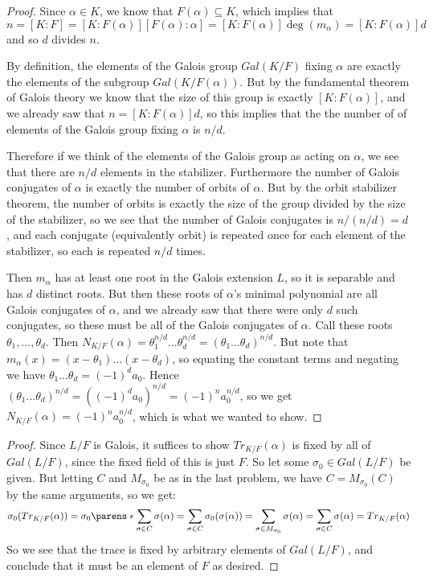 \documentclass[11pt]{article}
\begin{document}
\begin{proof}
  Since $\alpha \in K$, we know that $F(\alpha) \subseteq K$, which implies that
  \begin{equation*}
    n = [K:F] = [K:F(\alpha)][F(\alpha):\alpha] = [K:F(\alpha)]\deg(m_{\alpha}) = [K:F(\alpha)]d
  \end{equation*}
  and so $d$ divides $n$.

  By definition, the elements of the Galois group $Gal(K/F)$ fixing $\alpha$ are exactly the elements of the subgroup $Gal(K/F(\alpha))$.
  But by the fundamental theorem of Galois theory we know that the size of this group is exactly $[K:F(\alpha)]$, and we already saw that $n = [K:F(\alpha)]d$, so this implies that the the number of of elements of the Galois group fixing $\alpha$ is $n/d$.
  
  Therefore if we think of the elements of the Galois group as acting on $\alpha$, we see that there are $n/d$ elements in the stabilizer.
  Furthermore the number of Galois conjugates of $\alpha$ is exactly the number of orbits of $\alpha$.
  But by the orbit stabilizer theorem, the number of orbits is exactly the size of the group divided by the size of the stabilizer, so we see that the number of Galois conjugates is $n / (n/d) = d$, and each conjugate (equivalently orbit) is repeated once for each element of the stabilizer, so each is repeated $n/d$ times.

  Then $m_\alpha$ has at least one root in the Galois extension $L$, so it is separable and has $d$ distinct roots.
  But then these roots of $\alpha$'s minimal polynomial are all Galois conjugates of $\alpha$, and we already saw that there were only $d$ such conjugates, so these must be all of the Galois conjugates of $\alpha$.
  Call these roots $\theta_1,...,\theta_d$.
  Then $N_{K/F}(\alpha) = \theta_1^{n/d}...\theta_d^{n/d} = (\theta_1...\theta_d)^{n/d}$.
  But note that $m_\alpha(x) = (x-\theta_1)...(x-\theta_d)$, so equating the constant terms and negating we have $\theta_1...\theta_d = (-1)^da_0$.
  Hence $(\theta_1...\theta_d)^{n/d} = ((-1)^da_0)^{n/d} = (-1)^na_0^{n/d}$, so we get $N_{K/F}(\alpha) = (-1)^na_0^{n/d}$, which is what we wanted to show. 
\end{proof}


\begin{proof}
  Since $L/F$ is Galois, it suffices to show $Tr_{K/F}(\alpha)$ is fixed by all of $Gal(L/F)$, since the fixed field of this is just $F$.
  So let some $\sigma_0 \in Gal(L/F)$ be given.
  But letting $C$ and $M_{\sigma_0}$ be as in the last problem, we have $C = M_{\sigma_0}(C)$ by the same arguments, so we get:
  \begin{equation*}
    \sigma_0(Tr_{K/F}(\alpha))
    = \sigma_0\parens*{\sum_{\sigma \in C} \sigma(\alpha)}
    = \sum_{\sigma \in C} \sigma_0(\sigma(\alpha))
    = \sum_{\sigma \in M_{\sigma_0}} \sigma(\alpha)
    = \sum_{\sigma \in C} \sigma(\alpha)
    = Tr_{K/F}(\alpha)
  \end{equation*}
  So we see that the trace is fixed by arbitrary elements of $Gal(L/F)$, and conclude that it must be an element of $F$ as desired.
\end{proof}
\end{document}
